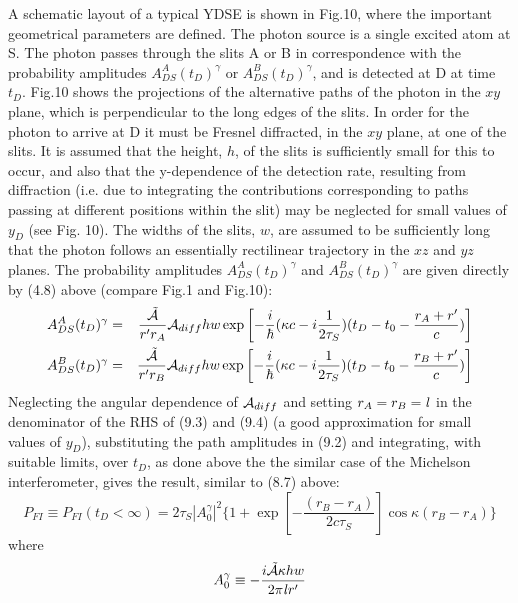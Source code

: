 {   \par A schematic layout of a typical YDSE is shown in Fig.10, where the important geometrical
    parameters are defined. The photon source is a single excited atom at S. The photon passes through
   the slits A or B in correspondence with the probability amplitudes $A_{DS}^A(t_D)^{\gamma}$
    or  $A_{DS}^B(t_D)^{\gamma}$, and is detected at D at time $t_D$.  Fig.10 shows the projections of the alternative
   paths of the photon in the $xy$ plane, which is perpendicular to the long edges of the slits.
    In order for the photon to arrive at D it must be Fresnel diffracted, in the $xy$ plane, at
  one of the slits. It is assumed that the height, $h$, of the slits is sufficiently small
  for this to occur, and also that the y-dependence of the detection rate, resulting from diffraction
   (i.e. due to integrating the contributions corresponding to paths passing at different positions
   within the slit) may be neglected for small values of $y_D$ (see Fig. 10). The widths of the slits, $w$, 
    are assumed to be sufficiently long that the photon follows an essentially rectilinear trajectory 
   in the $xz$ and $yz$ planes. The probability amplitudes $A_{DS}^A(t_D)^{\gamma}$
    and  $A_{DS}^B(t_D)^{\gamma}$ are given directly by (4.8) above (compare Fig.1 and Fig.10):
     \begin{eqnarray}
 A_{DS}^A(t_D)^{\gamma} &  = &  \frac{\tilde{{\cal A}}}{r' r_A} {\cal A}_{diff} h w
   \exp\left[ -\frac{i}{\hbar}(\kappa c-i\frac{1}{2 \tau_S})(t_D-t_0- \frac{r_A+r'}{c})\right] \\
 A_{DS}^B(t_D)^{\gamma} &  = &  \frac{\tilde{{\cal A}}}{r' r_B} {\cal A}_{diff} h w
   \exp\left[ -\frac{i}{\hbar}(\kappa c-i\frac{1}{2 \tau_S})(t_D-t_0- \frac{r_B+r'}{c})\right] 
 \end{eqnarray} 
  Neglecting the angular dependence of $ {\cal A}_{diff}$ and setting $r_A = r_B = {\it l}$ in the 
   denominator of the RHS of (9.3) and (9.4) (a good approximation for small values of
   $y_D$), substituting the path amplitudes in (9.2) and integrating, with suitable limits, over $t_D$,
    as done above the the similar case of the Michelson interferometer, gives the result,
   similar to (8.7)   above:
   \begin{equation}
    P_{FI} \equiv P_{FI}(t_D < \infty) = 2 \tau_S |A_0^{\gamma}|^2\{1+\exp\left[-\frac{(r_B-r_A)}{2 c \tau_S}\right]
   \cos\kappa(r_B-r_A)\}
   \end{equation}
   where
   \begin{equation}
  A_0^{\gamma} \equiv - \frac{i\tilde{{\cal A}} \kappa h w}{2 \pi {\it l} r'}   

\end{equation}}
